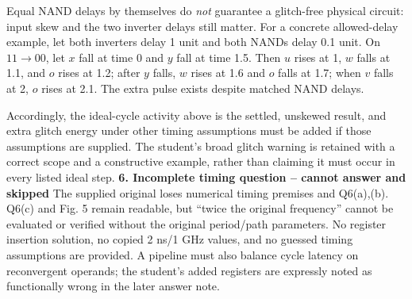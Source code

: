 \documentclass[10pt]{article}
\begin{document}
Equal NAND delays by themselves do \emph{not} guarantee a glitch-free physical circuit: input skew and the two inverter delays still matter. For a concrete allowed-delay example, let both inverters delay 1 unit and both NANDs delay 0.1 unit. On $11\to00$, let $x$ fall at time 0 and $y$ fall at time 1.5. Then $u$ rises at 1, $w$ falls at 1.1, and $o$ rises at 1.2; after $y$ falls, $w$ rises at 1.6 and $o$ falls at 1.7; when $v$ falls at 2, $o$ rises at 2.1. The extra pulse exists despite matched NAND delays.

Accordingly, the ideal-cycle activity above is the settled, unskewed result, and extra glitch energy under other timing assumptions must be added if those assumptions are supplied. The student's broad glitch warning is retained with a correct scope and a constructive example, rather than claiming it must occur in every listed ideal step.
\newpage
\textbf{6. Incomplete timing question -- cannot answer and skipped}
The supplied original loses numerical timing premises and Q6(a),(b). Q6(c) and Fig. 5 remain readable, but ``twice the original frequency'' cannot be evaluated or verified without the original period/path parameters. No register insertion solution, no copied 2 ns/1 GHz values, and no guessed timing assumptions are provided. A pipeline must also balance cycle latency on reconvergent operands; the student's added registers are expressly noted as functionally wrong in the later answer note.
\end{document}
